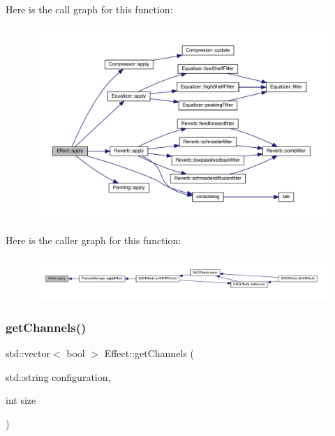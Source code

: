 Here is the call graph for this function\+:
\nopagebreak
\begin{figure}[H]
\begin{center}
\leavevmode
\includegraphics[width=350pt]{class_effect_a6d212ada944f12afbcd8e3e6e623df51_cgraph}
\end{center}
\end{figure}
Here is the caller graph for this function\+:
\nopagebreak
\begin{figure}[H]
\begin{center}
\leavevmode
\includegraphics[width=350pt]{class_effect_a6d212ada944f12afbcd8e3e6e623df51_icgraph}
\end{center}
\end{figure}
\mbox{\label{class_effect_ae108c1645f18162929cd5c272a30f74e}} 
\subsubsection{\texorpdfstring{get\+Channels()}{getChannels()}}
{\footnotesize\ttfamily std\+::vector$<$ bool $>$ Effect\+::get\+Channels (\begin{DoxyParamCaption}\item[{std\+::string}]{configuration,  }\item[{int}]{size }\end{DoxyParamCaption})\hspace{0.3cm}{\ttfamily [static]}}


